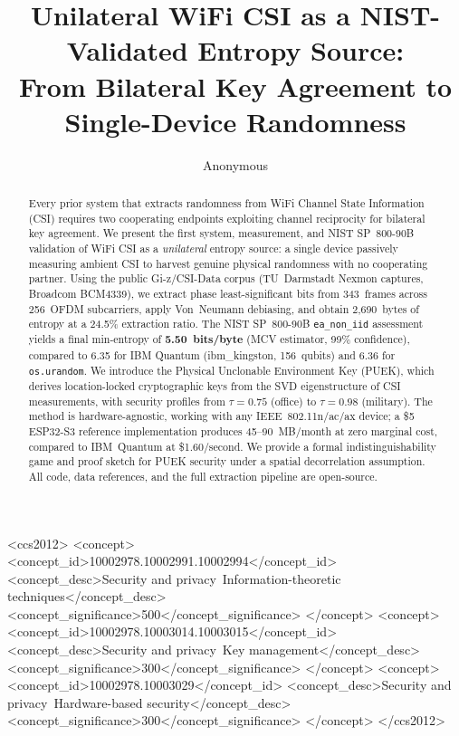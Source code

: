 \documentclass[sigconf,anonymous,review]{acmart}
\begin{document}
\title{Unilateral WiFi CSI as a NIST-Validated Entropy Source: \\
From Bilateral Key Agreement to Single-Device Randomness}

\author{Anonymous}

\begin{abstract}
Every prior system that extracts randomness from WiFi Channel State Information (CSI) requires two cooperating endpoints exploiting channel reciprocity for bilateral key agreement.
We present the first system, measurement, and NIST SP~800-90B validation of WiFi CSI as a \emph{unilateral} entropy source: a single device passively measuring ambient CSI to harvest genuine physical randomness with no cooperating partner.
Using the public Gi-z/CSI-Data corpus (TU~Darmstadt Nexmon captures, Broadcom BCM4339), we extract phase least-significant bits from 343~frames across 256~OFDM subcarriers, apply Von~Neumann debiasing, and obtain 2,690~bytes of entropy at a 24.5\% extraction ratio.
The NIST SP~800-90B \texttt{ea\_non\_iid} assessment yields a final min-entropy of \textbf{5.50~bits/byte} (MCV estimator, 99\% confidence), compared to 6.35 for IBM Quantum (ibm\_kingston, 156~qubits) and 6.36 for \texttt{os.urandom}.
We introduce the Physical Unclonable Environment Key (PUEK), which derives location-locked cryptographic keys from the SVD eigenstructure of CSI measurements, with security profiles from $\tau=0.75$ (office) to $\tau=0.98$ (military).
The method is hardware-agnostic, working with any IEEE~802.11n/ac/ax device; a \$5 ESP32-S3 reference implementation produces 45--90~MB/month at zero marginal cost, compared to IBM~Quantum at \$1.60/second.
We provide a formal indistinguishability game and proof sketch for PUEK security under a spatial decorrelation assumption.
All code, data references, and the full extraction pipeline are open-source.
\end{abstract}

\begin{CCSXML}
<ccs2012>
<concept>
<concept_id>10002978.10002991.10002994</concept_id>
<concept_desc>Security and privacy~Information-theoretic techniques</concept_desc>
<concept_significance>500</concept_significance>
</concept>
<concept>
<concept_id>10002978.10003014.10003015</concept_id>
<concept_desc>Security and privacy~Key management</concept_desc>
<concept_significance>300</concept_significance>
</concept>
<concept>
<concept_id>10002978.10003029</concept_id>
<concept_desc>Security and privacy~Hardware-based security</concept_desc>
<concept_significance>300</concept_significance>
</concept>
</ccs2012>
\end{CCSXML}
\end{document}
